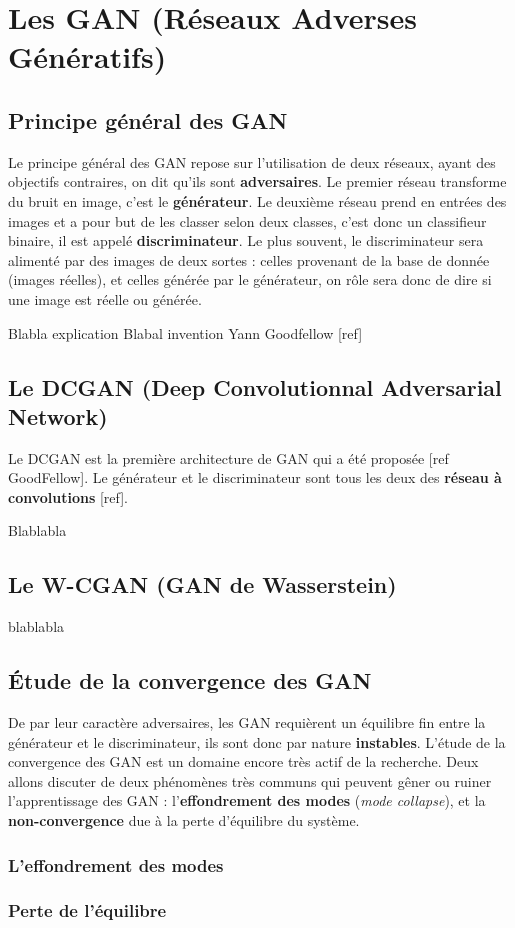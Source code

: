 \chapter{Les GAN (Réseaux Adverses Génératifs)}

\section{Principe général des GAN}
Le principe général des GAN repose sur l'utilisation de deux réseaux, ayant des objectifs contraires, on dit qu'ils sont \textbf{adversaires}. Le premier réseau transforme du bruit en image, c'est le \textbf{générateur}. Le deuxième réseau prend en entrées des images et a pour but de les classer selon deux classes, c'est donc un classifieur binaire, il est appelé \textbf{discriminateur}. Le plus souvent, le discriminateur sera alimenté par des images de deux sortes : celles provenant de la base de donnée (images réelles), et celles générée par le générateur, on rôle sera donc de dire si une image est réelle ou générée.

Blabla explication
Blabal invention Yann Goodfellow [ref]


\section{Le DCGAN (Deep Convolutionnal Adversarial Network)}
Le DCGAN est la première architecture de GAN qui a été proposée [ref GoodFellow]. Le générateur et le discriminateur sont tous les deux des \textbf{réseau à convolutions} [ref].

Blablabla

\section{Le W-CGAN (GAN de Wasserstein)}

blablabla

\section{Étude de la convergence des GAN}

De par leur caractère adversaires, les GAN requièrent un équilibre fin entre la générateur et le discriminateur, ils sont donc par nature \textbf{instables}. L'étude de la convergence des GAN est un domaine encore très actif de la recherche. Deux allons discuter de deux phénomènes très communs qui peuvent gêner ou ruiner l'apprentissage des GAN : l'\textbf{effondrement des modes} (\textit{mode collapse}), et la \textbf{non-convergence} due à la perte d'équilibre du système.

\subsection{L'effondrement des modes}



\subsection{Perte de l'équilibre}